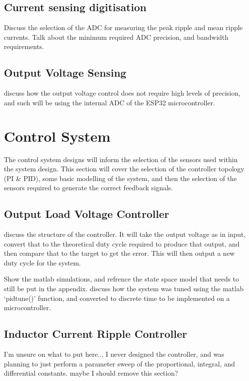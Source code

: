 \subsection*{Current sensing digitisation}\label{S:current_sense_ADC_design}

Discuss the selection of the ADC for measuring the peak ripple and mean ripple currents. Talk about the minimum required ADC precision, and bandwidth requirements. 


\subsection{Output Voltage Sensing}

discuss how the output voltage control does not require high levels of precision, and such will be using the internal ADC of the ESP32 microcontroller.  


%
%

\section{Control System}\label{S:control_design}

The control system designs will inform the selection of the sensors used within the system design. This section will cover the selection of the controller topology (PI \& PID), some basic modelling of the system, and then the selection of the sensors required to generate the correct feedback signals. 

\subsection{Output Load Voltage Controller}\label{S:output_control_design}

discuss the structure of the controller. It will take the output voltage as in input, convert that to the theoretical duty cycle required to produce that output, and then compare that to the target to get the error. This will then output a new duty cycle for the system.

Show the matlab simulations, and refrence the state space model that needs to still be put in the appendix. discuss how the system was tuned using the matlab `pidtune()' function, and converted to discrete time to be implemented on a microcontroller. 

\subsection{Inductor Current Ripple Controller}\label{S:ripple_control_design}

I'm unsure on what to put here... I never designed the controller, and was planning to just perform a parameter sweep of the proportional, integral, and differential constants. maybe I should remove this section?




